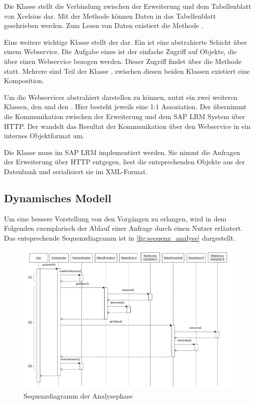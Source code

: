 \begin{onehalfspacing}
Die Klasse  stellt die Verbindung zwischen der Erweiterung und dem Tabellenblatt von \gls{Xcelsius} dar. Mit der Methode  können Daten in das Tabellenblatt geschrieben werden. Zum Lesen von Daten existiert die Methode .

Eine weitere wichtige Klasse stellt der  dar. Ein  ist eine abstrahierte Schicht über einem Webservice. Die Aufgabe eines  ist der einfache Zugriff auf Objekte, die über einen Webservice bezogen werden. Dieser Zugriff findet über die Methode  statt. Mehrere  sind Teil der Klasse , zwischen diesen beiden Klassen existiert eine Komposition.

Um die Webservices abstrahiert darstellen zu können, nutzt ein  zwei weiteren Klassen, den  und den . Hier besteht jeweils eine 1:1 Assoziation. Der  übernimmt die Kommunikation zwischen der Erweiterung und dem SAP LRM System über \gls{HTTP}. Der  wandelt das Resultat der Kommunikation über den Webservice in ein internes Objektformat um.

Die Klasse  muss im SAP LRM implementiert werden. Sie nimmt die Anfragen der Erweiterung über \gls{HTTP} entgegen, liest die entsprechenden Objekte aus der Datenbank und serialisiert sie im \gls{XML}-Format.

\subsection{Dynamisches Modell}
Um eine bessere Vorstellung von den Vorgängen zu erlangen, wird in dem Folgenden exemplarisch der Ablauf einer Anfrage durch einen Nutzer erläutert. Das entsprechende Sequenzdiagramm ist in \vref{fig:sequenz_analyse} dargestellt.

\begin{figure}[h]
\centering
\setlength{\unitlength}{1mm}
\includegraphics[width=15cm]{Visio/Analyse-Sequenz.pdf}
\caption{Sequenzdiagramm der Analysephase \label{fig:sequenz_analyse}}
\end{figure} 



\end{onehalfspacing}
